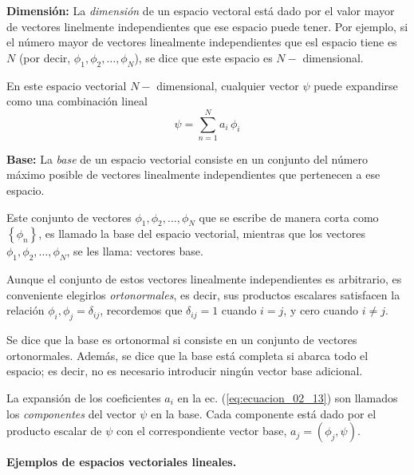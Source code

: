 \textbf{Dimensión: } La \emph{dimensión} de un espacio vectoral está dado por el valor mayor de vectores linelmente independientes que ese espacio puede tener. Por ejemplo, si el número mayor de vectores linealmente independientes que esl espacio tiene es $N$ (por decir, $\phi_{1}, \phi_{2}, \ldots, \phi_{N}$), se dice que este espacio es $N-$ dimensional.
\par
En este espacio vectorial $N-$ dimensional, cualquier vector $\psi$ puede expandirse como una combinación lineal
\begin{equation}
\psi = \sum_{n=1}^{N} a_{i} \, \phi_{i}
\label{eq:ecuacion_02_13}
\end{equation}

\textbf{Base: } La \emph{base} de un espacio vectorial consiste en un conjunto del número máximo posible de vectores linealmente independientes que pertenecen a ese espacio.
\par
Este conjunto de vectores $\phi_{1}, \phi_{2}, \ldots, \phi_{N}$ que se escribe de manera corta como $\left\{ \phi_{n} \right\}$, es llamado la base del espacio vectorial, mientras que los vectores $\phi_{1}, \phi_{2}, \ldots, \phi_{N}$, se les llama: vectores base.
\par
Aunque el conjunto de estos vectores linealmente independientes es arbitrario, es conveniente elegirlos \emph{ortonormales}, es decir, sus productos escalares satisfacen la relación $\phi_{i}, \phi_{j} = \delta_{ij}$, recordemos que $\delta_{ij} = 1$ cuando $i = j$, y cero cuando $i \neq j$.
\par
Se dice que la base es ortonormal si consiste en un conjunto de vectores ortonormales. Además, se dice que la base está completa si abarca todo el espacio; es decir, no es necesario introducir ningún vector base adicional.
\par
La expansión de los coeficientes $a_{i}$ en la ec. (\ref{eq:ecuacion_02_13}) son llamados los \emph{componentes} del vector $\psi$ en la base. Cada componente está dado por el producto escalar de $\psi$ con el correspondiente vector base, $a_{j} = (\phi_{j}, \psi)$.
\par
\textbf{Ejemplos de espacios vectoriales lineales.}

